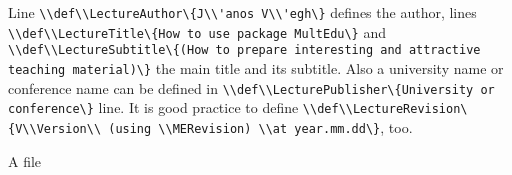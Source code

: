 {
Line \lstinline|\\def\\LectureAuthor\{J\\'anos V\\'egh\}| defines the author,
lines \lstinline|\\def\\LectureTitle\{How to use package MultEdu\}|
and \lstinline|\\def\\LectureSubtitle\{(How to prepare interesting and attractive teaching material)\}| the main title and its subtitle.
Also a university name or conference name can be defined in \lstinline|\\def\\LecturePublisher\{University or conference\}| line.
It is good practice to define \lstinline|\\def\\LectureRevision\{V\\Version\\ (using \\MERevision) \\at year.mm.dd\}|, too.

}
{A  file}
